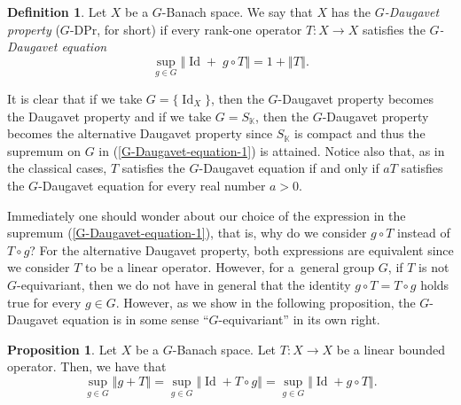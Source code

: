 \documentclass[a4paper,12pt]{amsart}
\theoremstyle{definition}
\newtheorem{proposition}[theorem]{Proposition}
\theoremstyle{definition}
\newtheorem{definition}[theorem]{Definition}
\theoremstyle{remark}
\numberwithin{equation}{section}
\newcommand{\K}{\mathbb{K}}
\DeclareMathOperator{\id}{Id}
\newcommand{\<}{\langle}
\renewcommand{\>}{\rangle}
\newcommand{\norm}[1]{\left\Vert#1\right\Vert}
\begin{document}
	
	\begin{definition} \label{definition-G-DPr}
		Let $X$ be a $G$-Banach space. We say that $X$ has the \emph{$G$-Daugavet property} ($G$-DPr, for short) if every rank-one operator $T:X\to X$ satisfies the \emph{$G$-Daugavet equation}
		\begin{equation} \label{G-Daugavet-equation-1}
			\sup_{g\in G}\norm{\id + \; g \circ T}=1+\norm{T}.
		\end{equation}
	\end{definition}
	
	
	It is clear that if we take $G=\{\id_X \}$, then the $G$-Daugavet property becomes the Daugavet property and if we take $G=S_{\K}$, then the $G$-Daugavet property becomes the alternative Daugavet property since $S_{\K}$ is compact and thus the supremum on $G$ in (\ref{G-Daugavet-equation-1}) is attained. Notice also that, as in the classical cases, $T$ satisfies the $G$-Daugavet equation if and only if $aT$ satisfies the $G$-Daugavet equation for every real number $a > 0$.
	
	
	Immediately one should wonder about our choice of the expression in the supremum (\ref{G-Daugavet-equation-1}), that is, why do we consider $g\circ T$ instead of $T\circ g$? For the alternative Daugavet property, both expressions are equivalent since we consider $T$ to be a linear operator. However, for a~general group $G$, if $T$ is not $G$-equivariant, then we do not have in general that the identity $g\circ T=T\circ g$ holds true for every $g\in G$. However, as we show in the following proposition, the $G$-Daugavet equation is in some sense ``$G$-equivariant'' in its own right.
	
	
	\begin{proposition} \label{fact:G-DP-equation-commutes}
		Let $X$ be a $G$-Banach space. Let $T: X \to X$ be a linear bounded operator. Then, we have that
		\begin{equation*}
			\sup_{g \in G} \norm{g + T}
			= \sup_{g \in G} \norm{\id + T \circ g}
			= \sup_{g \in G} \norm{\id + g \circ T}.
		\end{equation*}
	\end{proposition}
	
\end{document}
